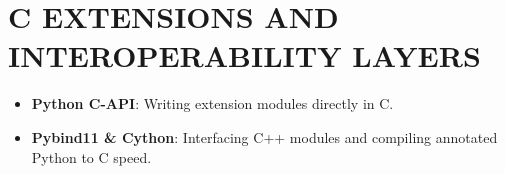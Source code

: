 \hypertarget{c-extensions-and-interoperability-layers}{%
\chapter{C EXTENSIONS AND INTEROPERABILITY
LAYERS}\label{c-extensions-and-interoperability-layers}}

\begin{itemize}
\tightlist
\item
  \textbf{Python C-API}: Writing extension modules directly in C.
\item
  \textbf{Pybind11 \& Cython}: Interfacing C++ modules and compiling
  annotated Python to C speed.
\end{itemize}

